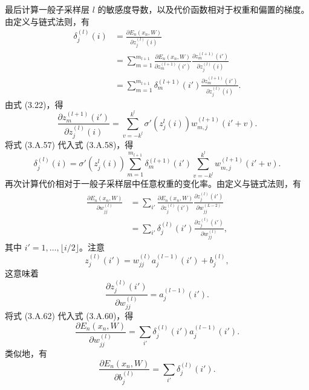 
最后计算一般子采样层 $l$ 的敏感度导数，以及代价函数相对于权重和偏置的梯度。由定义与链式法则，有
\begin{equation}
\begin{aligned}
\delta_j^{(l)}(i)
&=\frac{\partial E_n(x_n,W)}{\partial z_j^{(l)}(i)}\\
&=\sum_{m=1}^{m_{l+1}}\frac{\partial E_n(x_n,W)}{\partial z_m^{(l+1)}(i')}
\frac{\partial z_m^{(l+1)}(i')}{\partial z_j^{(l)}(i)}\\
&=\sum_{m=1}^{m_{l+1}}\delta_m^{(l+1)}(i')
\frac{\partial z_m^{(l+1)}(i')}{\partial z_j^{(l)}(i)}.
\end{aligned}
\tag{3.A.57}
\end{equation}
由式 (3.22)，得
\begin{equation}
\frac{\partial z_m^{(l+1)}(i')}{\partial z_j^{(l)}(i)}
=\sum_{v=-k^l}^{k^l}\sigma'(z_j^l(i))w_{m,j}^{(l+1)}(i'+v).
\tag{3.A.58}
\end{equation}
将式 (3.A.57) 代入式 (3.A.58)，得
\begin{equation}
\delta_j^{(l)}(i)=\sigma'(z_j^l(i))
\sum_{m=1}^{m_{l+1}}\delta_m^{(l+1)}(i')
\sum_{v=-k^l}^{k^l}w_{m,j}^{(l+1)}(i'+v).
\tag{3.A.59}
\end{equation}
再次计算代价相对于一般子采样层中任意权重的变化率。由定义与链式法则，有
\begin{equation}
\begin{aligned}
\frac{\partial E_n(x_n,W)}{\partial w_{jj}^{(l)}}
&=\sum_{i'}\frac{\partial E_n(x_n,W)}{\partial z_j^{(l)}(i')}
\frac{\partial z_j^{(l)}(i')}{\partial w_{jj}^{(L-2)}}\\
&=\sum_{i'}\delta_j^{(l)}(i')\frac{\partial z_j^{(l)}(i')}{\partial w_{jj}^{(l)}},
\end{aligned}
\tag{3.A.60}
\end{equation}
其中 $i'=1,\ldots,\lfloor i/2\rfloor$。注意
\begin{equation}
z_j^{(l)}(i')=w_{jj}^{(l)}a_j^{(l-1)}(i')+b_j^{(l)},
\tag{3.A.61}
\end{equation}
这意味着
\begin{equation}
\frac{\partial z_j^{(l)}(i')}{\partial w_{jj}^{(l)}}=a_j^{(l-1)}(i').
\tag{3.A.62}
\end{equation}
将式 (3.A.62) 代入式 (3.A.60)，得
\begin{equation}
\frac{\partial E_n(x_n,W)}{\partial w_{jj}^{(l)}}
=\sum_{i'}\delta_j^{(l)}(i')a_j^{(l-1)}(i').
\tag{3.A.63}
\end{equation}
类似地，有
\begin{equation}
\frac{\partial E_n(x_n,W)}{\partial b_j^{(l)}}=\sum_{i'}\delta_j^{(l)}(i').
\tag{3.A.64}
\end{equation}
\FloatBarrier

